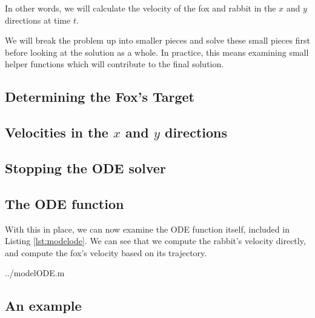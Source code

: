 In other words, we will calculate the velocity of the fox and rabbit in the $x$ and $y$ directions at time $t$.

We will break the problem up into smaller pieces and solve these small pieces first before looking at the solution as a whole. In practice, this means examining small helper functions which will contribute to the final solution.

\subsection {Determining the Fox's Target} \label{lbl:foxtarget}



\subsection {Velocities in the $x$ and $y$ directions}



\subsection {Stopping the ODE solver}



\subsection{The ODE function}

With this in place, we can now examine the ODE function itself, included in Listing \ref{lst:modelode}. We can see that we compute the rabbit's velocity directly, and compute the fox's velocity based on its trajectory.

  {../modelODE.m}

\subsection{An example}

\label{sec:example}

